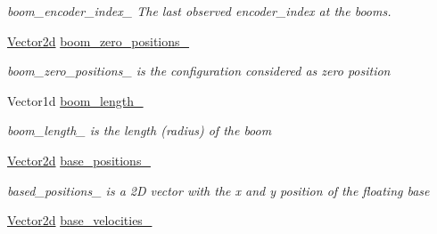 \begin{DoxyCompactItemize}
\begin{DoxyCompactList}\small\item\em boom\+\_\+encoder\+\_\+index\+\_\+ The last observed encoder\+\_\+index at the booms. \end{DoxyCompactList}\item 
\hyperlink{common__header_8hpp_acb6916bc8c9fe9d98c484fd4cc201447}{Vector2d} \hyperlink{classblmc__robots_1_1Stuggihop_ac07e867e6e76dde5980e18cff7f69d04}{boom\+\_\+zero\+\_\+positions\+\_\+}\hypertarget{classblmc__robots_1_1Stuggihop_ac07e867e6e76dde5980e18cff7f69d04}{}\label{classblmc__robots_1_1Stuggihop_ac07e867e6e76dde5980e18cff7f69d04}

\begin{DoxyCompactList}\small\item\em boom\+\_\+zero\+\_\+positions\+\_\+ is the configuration considered as zero position \end{DoxyCompactList}\item 
Vector1d \hyperlink{classblmc__robots_1_1Stuggihop_a65986a607e6ab98fa497abfdfebc0f7a}{boom\+\_\+length\+\_\+}\hypertarget{classblmc__robots_1_1Stuggihop_a65986a607e6ab98fa497abfdfebc0f7a}{}\label{classblmc__robots_1_1Stuggihop_a65986a607e6ab98fa497abfdfebc0f7a}

\begin{DoxyCompactList}\small\item\em boom\+\_\+length\+\_\+ is the length (radius) of the boom \end{DoxyCompactList}\item 
\hyperlink{common__header_8hpp_acb6916bc8c9fe9d98c484fd4cc201447}{Vector2d} \hyperlink{classblmc__robots_1_1Stuggihop_a2c2e6bad59b31a36f0cbadb2516afcba}{base\+\_\+positions\+\_\+}\hypertarget{classblmc__robots_1_1Stuggihop_a2c2e6bad59b31a36f0cbadb2516afcba}{}\label{classblmc__robots_1_1Stuggihop_a2c2e6bad59b31a36f0cbadb2516afcba}

\begin{DoxyCompactList}\small\item\em based\+\_\+positions\+\_\+ is a 2D vector with the x and y position of the floating base \end{DoxyCompactList}\item 
\hyperlink{common__header_8hpp_acb6916bc8c9fe9d98c484fd4cc201447}{Vector2d} \hyperlink{classblmc__robots_1_1Stuggihop_a15b92fee74712cb5fae01bfc9204e86b}{base\+\_\+velocities\+\_\+}\hypertarget{classblmc__robots_1_1Stuggihop_a15b92fee74712cb5fae01bfc9204e86b}{}\label{classblmc__robots_1_1Stuggihop_a15b92fee74712cb5fae01bfc9204e86b}


\end{DoxyCompactItemize}
